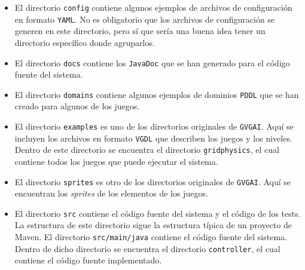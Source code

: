 \documentclass[11pt,a4paper]{article}
\begin{document}
\begin{itemize}[label=\textbullet]
    \item El directorio \texttt{config} contiene algunos ejemplos de  archivos de configuración en formato
    \texttt{YAML}. No es obligatorio que los archivos de configuración se generen en este directorio, pero
    sí que sería una buena idea tener un directorio específico donde agruparlos.
    \item El directorio \texttt{docs} contiene los \texttt{JavaDoc} que se han generado para el código
    fuente del sistema.
    \item El directorio \texttt{domains} contiene algunos ejemplos de dominios \texttt{PDDL} que se han
    creado para algunos de los juegos.
    \item El directorio \texttt{examples} es uno de los directorios originales de \texttt{GVGAI}. Aquí
    se incluyen los archivos en formato \texttt{VGDL} que describen los juegos y los niveles. Dentro de
    este directorio se encuentra el directorio \texttt{gridphysics}, el cual contiene todos los juegos
    que puede ejecutar el sistema.
    \item El directorio \texttt{sprites} es otro de los directorios originales de \texttt{GVGAI}. Aquí se
    encuentran los \textit{sprites} de los elementos de los juegos.
    \item El directorio \texttt{src} contiene el código fuente del sistema y el código de los tests. La
    estructura de este directorio sigue la estructura típica de un proyecto de Maven. El directorio
    \texttt{src/main/java} contiene el código fuente del sistema. Dentro de dicho directorio se encuentra
    el directorio \texttt{controller}, el cual contiene el código fuente implementado.
    
    \begin{figure}[H]


\end{figure}
\end{itemize}
\end{document}
